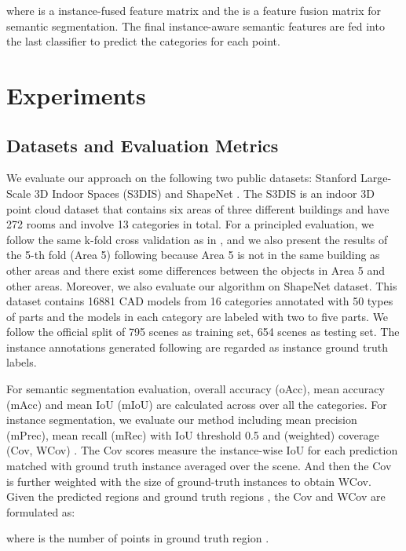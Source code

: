\documentclass[letterpaper]{article} \usepackage{aaai20}  \usepackage{times}  \usepackage{helvet} \usepackage{courier}  \usepackage[hyphens]{url}  \usepackage{graphicx} \urlstyle{rm} \def\UrlFont{\rm}  \usepackage{graphicx}  \frenchspacing  \setlength{\pdfpagewidth}{8.5in}  \setlength{\pdfpageheight}{11in}
\begin{document}
where  is a instance-fused feature matrix and the  is a feature fusion matrix for semantic segmentation. The final instance-aware semantic features are fed into the last classifier to predict the categories for each point.

\section{Experiments}
\subsection{Datasets and Evaluation Metrics}
We evaluate our approach on the following two public datasets: Stanford Large-Scale 3D Indoor Spaces (S3DIS) \cite{Armeni_2016_CVPR} and ShapeNet \cite{yi2016scalable}. The S3DIS is an indoor 3D point cloud dataset that contains six areas of three different buildings and have 272 rooms and involve 13 categories in total. For a principled evaluation, we follow the same k-fold cross validation as in \cite{qi2016pointnet}, and we also present the results of the 5-th fold (Area 5) following \cite{tchapmi2017segcloud} because Area 5 is not in the same building as other areas and there exist some differences between the objects in Area 5 and other areas. Moreover, we also evaluate our algorithm on ShapeNet dataset. This dataset contains 16881 CAD models from 16 categories annotated with 50 types of parts and the models in each category are labeled with two to five parts. We follow the official split of 795 scenes as training set, 654 scenes as testing set. The instance annotations generated following \cite{Wang_2018_CVPR} are regarded as instance ground truth labels.

For semantic segmentation evaluation, overall accuracy (oAcc), mean accuracy (mAcc) and mean IoU (mIoU) are calculated across over all the categories. For instance segmentation, we evaluate our method including mean precision (mPrec), mean recall (mRec) with IoU threshold 0.5 and (weighted) coverage (Cov, WCov) \cite{ren2017end,Wang_2019_CVPR}. The Cov scores measure the instance-wise IoU for each prediction matched with ground truth instance averaged over the scene. And then the Cov is further weighted with the size of ground-truth instances to obtain WCov. Given the predicted regions  and ground truth regions , the Cov and WCov are formulated as:



where  is the number of points in ground truth region .
\end{document}
